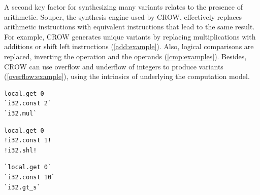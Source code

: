A second key factor for synthesizing many variants relates to the presence of arithmetic. Souper, the synthesis engine used by CROW, effectively replaces arithmetic instructions with equivalent instructions that lead to the same result. For example, CROW generates unique variants by replacing multiplications with additions or shift left instructions (\autoref{add:example}). Also, logical comparisons are replaced, inverting the operation and the operands (\autoref{cmp:examples}). Besides, CROW can use overflow and underflow of integers to produce variants (\autoref{overflow:example}), using the intrinsics of underlying the computation model.

{
\begin{code}
    \footnotesize

    \lstset{
        language=WAT,
        style=nccode,
        basicstyle=\footnotesize\ttfamily,
        columns=fullflexible,
        breaklines=true
    }
    \noindent\begin{minipage}[b]{0.32\linewidth}
        \label{add:example}
        \noindent\begin{minipage}[t]{0.46\linewidth}
            \begin{lstlisting}
local.get 0
`i32.const 2`
`i32.mul`
            \end{lstlisting}
        \end{minipage}%
        \hfill\noindent\begin{minipage}[t]{0.46\linewidth}
            
            \begin{lstlisting}
local.get 0
!i32.const 1!
!i32.shl!
            \end{lstlisting}
        \end{minipage}
    \end{minipage}\hfill%
    \begin{minipage}[b]{0.31\linewidth}
        \label{cmp:examples}
        \begin{minipage}[t]{.46\linewidth}
            \begin{lstlisting}
`local.get 0`
`i32.const 10`
`i32.gt_s`
            \end{lstlisting}
        \end{minipage}\hfill\begin{minipage}[t]{.46\linewidth}
           

\end{minipage}
\end{minipage}
\end{code}}
